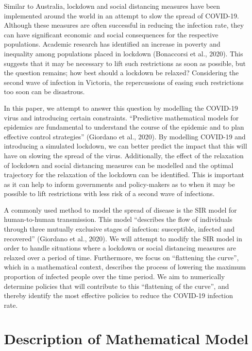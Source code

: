 \documentclass[10pt]{article}
\begin{document}
Similar to Australia, lockdown and social distancing measures have been implemented around the world in an attempt to slow the spread of COVID-19. Although these measures are often successful in reducing the infection rate, they can have significant economic and social consequences for the respective populations. Academic research has identified an increase in poverty and inequality among populations placed in lockdown (Bonaccorsi et al., 2020). This suggests that it may be necessary to lift such restrictions as soon as possible, but the question remains; how best should a lockdown be relaxed? Considering the second wave of infection in Victoria, the repercussions of easing such restrictions too soon can be disastrous. \newline

In this paper, we attempt to answer this question by modelling the COVID-19 virus and introducing certain constraints. ``Predictive mathematical models for epidemics are fundamental to understand the course of the epidemic and to plan effective control strategies'' (Giordano et al., 2020). By modelling COVID-19 and introducing a simulated lockdown, we can better predict the impact that this will have on slowing the spread of the virus. Additionally, the effect of the relaxation of lockdown and social distancing measures can be modelled and the optimal trajectory for the relaxation of the lockdown can be identified. This is important as it can help to inform governments and policy-makers as to when it may be possible to lift restrictions with less risk of a second wave of infections. \newline

A commonly used method to model the spread of disease is the SIR model for human-to-human transmission. This model ``describes the flow of individuals through three mutually exclusive stages of infection: susceptible, infected and recovered'' (Giordano et al., 2020). We will attempt to modify the SIR model in order to handle situations where a lockdown or social distancing measures are relaxed over a period of time. Furthermore, we focus on ``flattening the curve'', which in a mathematical context, describes the process of lowering the maximum proportion of infected people over the time period. We aim to numerically determine policies that will contribute to this ``flattening of the curve'', and thereby identify the most effective policies to reduce the COVID-19 infection rate.

\section{Description of Mathematical Model}
\end{document}
